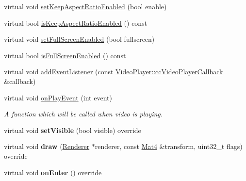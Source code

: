 \begin{DoxyCompactItemize}
\item 
virtual void \hyperlink{classexperimental_1_1ui_1_1VideoPlayer_a97787adc7535bbdbb74970784015ce01}{set\+Keep\+Aspect\+Ratio\+Enabled} (bool enable)
\item 
virtual bool \hyperlink{classexperimental_1_1ui_1_1VideoPlayer_af3bf649848afacd0efd84e06656f2828}{is\+Keep\+Aspect\+Ratio\+Enabled} () const
\item 
virtual void \hyperlink{classexperimental_1_1ui_1_1VideoPlayer_ab22336427d46be866e023e5b57f5fe68}{set\+Full\+Screen\+Enabled} (bool fullscreen)
\item 
virtual bool \hyperlink{classexperimental_1_1ui_1_1VideoPlayer_a466c25180bccd97a4e96708c94f6d1aa}{is\+Full\+Screen\+Enabled} () const
\item 
virtual void \hyperlink{classexperimental_1_1ui_1_1VideoPlayer_a18d411ee29a29b32e965daf2934836da}{add\+Event\+Listener} (const \hyperlink{classexperimental_1_1ui_1_1VideoPlayer_a64ebf250429fec0efea303b13cecf02e}{Video\+Player\+::cc\+Video\+Player\+Callback} \&callback)
\item 
virtual void \hyperlink{classexperimental_1_1ui_1_1VideoPlayer_a88b4f377554bef7bca9c974c30dac91b}{on\+Play\+Event} (int event)
\begin{DoxyCompactList}\small\item\em A function which will be called when video is playing. \end{DoxyCompactList}\item 
\mbox{\label{classexperimental_1_1ui_1_1VideoPlayer_a985e80592c90bf48352d8d1e8f80e6db}} 
virtual void {\bfseries set\+Visible} (bool visible) override
\item 
\mbox{\label{classexperimental_1_1ui_1_1VideoPlayer_a826447649569991f4bed709faee88e7a}} 
virtual void {\bfseries draw} (\hyperlink{classRenderer}{Renderer} $\ast$renderer, const \hyperlink{classMat4}{Mat4} \&transform, uint32\+\_\+t flags) override
\item 
\mbox{\label{classexperimental_1_1ui_1_1VideoPlayer_a34ce9b072958d0f9029724551bfbeec8}} 
virtual void {\bfseries on\+Enter} () override
\item 
\mbox{\label{classexperimental_1_1ui_1_1VideoPlayer_ad0fd0948305759e347a6b26f0020fc57}} 

\end{DoxyCompactItemize}

